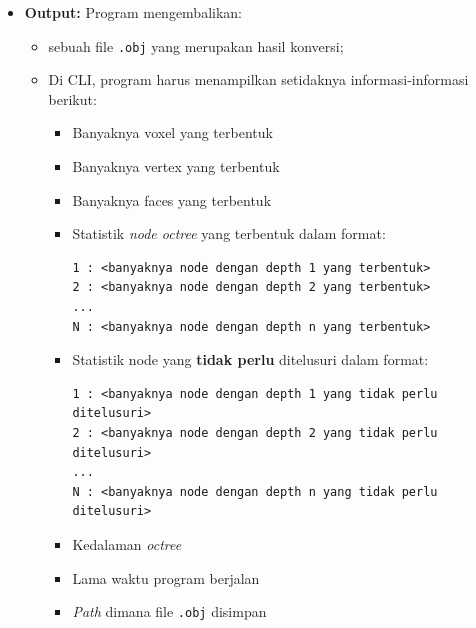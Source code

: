 \begin{itemize}[leftmargin=*]
    \item \textbf{Output:} Program mengembalikan:
        \begin{itemize}
            \item sebuah file \texttt{.obj} yang merupakan hasil konversi;
            \item Di CLI, program harus menampilkan setidaknya
                informasi-informasi berikut:
                \begin{itemize}
                    \item Banyaknya voxel yang terbentuk
                    \item Banyaknya vertex yang terbentuk
                    \item Banyaknya faces yang terbentuk
                    \item Statistik \textit{node octree} yang
                        terbentuk dalam format:
                        \begin{tcolorbox}[colback=white,
                            colframe=black, sharp corners, boxrule=0.5pt]
            \begin{verbatim}
1 : <banyaknya node dengan depth 1 yang terbentuk>
2 : <banyaknya node dengan depth 2 yang terbentuk>
...
N : <banyaknya node dengan depth n yang terbentuk>
            \end{verbatim}
                        \end{tcolorbox}
                    \item Statistik node yang \textbf{tidak perlu}
                        ditelusuri dalam format:
                        \begin{tcolorbox}[colback=white,
                            colframe=black, sharp corners, boxrule=0.5pt]

            \begin{verbatim}
1 : <banyaknya node dengan depth 1 yang tidak perlu ditelusuri>
2 : <banyaknya node dengan depth 2 yang tidak perlu ditelusuri>
...
N : <banyaknya node dengan depth n yang tidak perlu ditelusuri>
            \end{verbatim}
                        \end{tcolorbox}
                    \item Kedalaman \textit{octree}
                    \item Lama waktu program berjalan
                    \item \textit{Path} dimana file \texttt{.obj} disimpan
                \end{itemize}
        \end{itemize}
\end{itemize}

